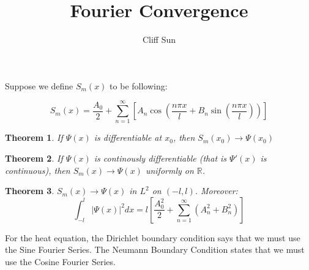 \documentclass{article}
\title{Fourier Convergence}
\author{Cliff Sun}
\newtheorem{theorem}{Theorem}[section]
\begin{document}
\maketitle

Suppose we define $S_m(x)$ to be following:

\begin{equation}
    S_m(x) = \frac{A_0}{2} + \sum_{n = 1}^{\infty}[A_n\cos(\frac{n\pi x}{l} + B_n\sin(\frac{n\pi x}{l}))]
\end{equation}

\begin{theorem}
    If $\Psi(x)$ is differentiable at $x_0$, then $S_m(x_0) \rightarrow \Psi(x_0)$
\end{theorem}

\begin{theorem}
    If $\Psi(x)$ is continously differentiable (that is $\Psi'(x)$ is continuous), then $S_m(x) \rightarrow \Psi(x)$ uniformly on $\mathbb{R}$. 
\end{theorem}

\begin{theorem}
    $S_m(x) \rightarrow \Psi(x)$ in $L^2$ on $(-l, l)$. Moreover:
    \begin{equation}
        \int_{-l}^{l}|\Psi(x)|^2dx = l[\frac{A_0^2}{2} + \sum_{n = 1}^{\infty}(A_n^2 + B_n^2)]
    \end{equation}
\end{theorem}

For the heat equation, the Dirichlet boundary condition says that we must use the Sine Fourier Series. The Neumann Boundary Condition states that we must use the Cosine Fourier Series. 
\end{document}
